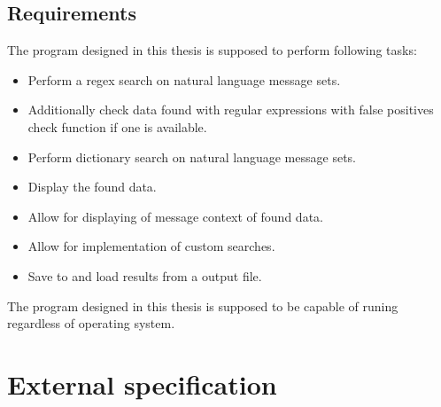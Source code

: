\documentclass[a4paper,twoside,12pt]{book}
\begin{document}
\section{Requirements}

The program designed in this thesis is supposed to perform following tasks:
\begin{itemize}
   \item Perform a regex search on natural language message sets.
   \item Additionally check data found with regular expressions with false positives check function if one is available.
   \item Perform dictionary search on natural language message sets.
   \item Display the found data.
   \item Allow for displaying of message context of found data.
   \item Allow for implementation of custom searches.
   \item Save to and load results from a output file.
\end{itemize}

The program designed in this thesis is supposed to be capable of runing regardless of operating system.



\chapter{External specification}
\end{document}
